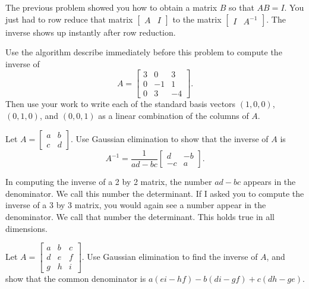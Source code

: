The previous problem showed you how to obtain a matrix $B$ so that $AB=I$. You just had to row reduce that matrix $\begin{bmatrix}A&I\end{bmatrix}$ to the matrix $\begin{bmatrix}I&A^{-1}\end{bmatrix}$.  The inverse shows up instantly after row reduction.


\begin{problem}
 Use the algorithm describe immediately before this problem to compute the inverse of $$A=\begin{bmatrix}
 3 & 0 & 3 \\
 0 & -1 & 1 \\
 0 & 3 & -4
\end{bmatrix}.$$  
Then use your work to write each of the standard basis vectors $(1,0,0)$, $(0,1,0)$, and $(0,0,1)$ as a linear combination of the columns of $A$.  
\end{problem}


\begin{problem}
 Let $A=\begin{bmatrix}a&b\\c&d\end{bmatrix}$. Use Gaussian elimination to show that the inverse of $A$ is 
$$A^{-1}=\frac{1}{ad-bc}\begin{bmatrix}d&-b\\-c&a\end{bmatrix}.$$
\end{problem}

In computing the inverse of a 2 by 2 matrix, the number $ad-bc$ appears in the denominator. We call this number the determinant.  If I asked you to compute the inverse of a 3 by 3 matrix, you would again see a number appear in the denominator.  We call that number the determinant. This holds true in all dimensions.

\begin{problem*}[Optional]
  Let $A=\begin{bmatrix}a&b&c\\d&e&f\\g&h&i\end{bmatrix}$. Use Gaussian elimination to find the inverse of $A$, and show that the common denominator is $a(ei-hf)-b(di-gf)+c(dh-ge)$. 
\end{problem*}


